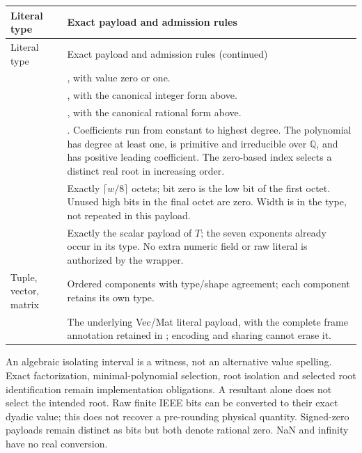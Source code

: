 \begin{longtable}{@{}P{.23\linewidth}P{.72\linewidth}@{}}
\toprule Literal type & Exact payload and admission rules\\\midrule\endfirsthead
\toprule Literal type & Exact payload and admission rules (continued)\\\midrule\endhead
\bottomrule\endfoot
{} & , with value zero or one.\\
 & , with the canonical integer form above.\\
 & , with the canonical rational form above.\\
 & . Coefficients run from
constant to highest degree. The polynomial has degree at least one, is primitive
and irreducible over $\mathbb Q$, and has positive leading coefficient. The
zero-based index selects a distinct real root in increasing order.\\
 & Exactly $\lceil w/8\rceil$ octets; bit zero is the low bit of
the first octet. Unused high bits in the final octet are zero. Width is in the
type, not repeated in this payload.\\
 & Exactly the scalar payload of $T$; the seven exponents already
occur in its type. No extra numeric field or raw  literal is
authorized by the wrapper.\\
Tuple, vector, matrix & Ordered  components with type/shape
agreement; each component retains its own type.\\
 & The underlying Vec/Mat literal payload, with the complete frame
annotation retained in ; encoding and sharing cannot erase it.\\
\end{longtable}
An algebraic isolating interval is a witness, not an alternative value spelling.
Exact factorization, minimal-polynomial selection, root isolation and selected
root identification remain implementation obligations. A resultant alone does
not select the intended root. Raw finite IEEE bits can be converted to their
exact dyadic value; this does not recover a pre-rounding physical quantity.
Signed-zero payloads remain distinct as bits but both denote rational zero.
NaN and infinity have no real conversion.

